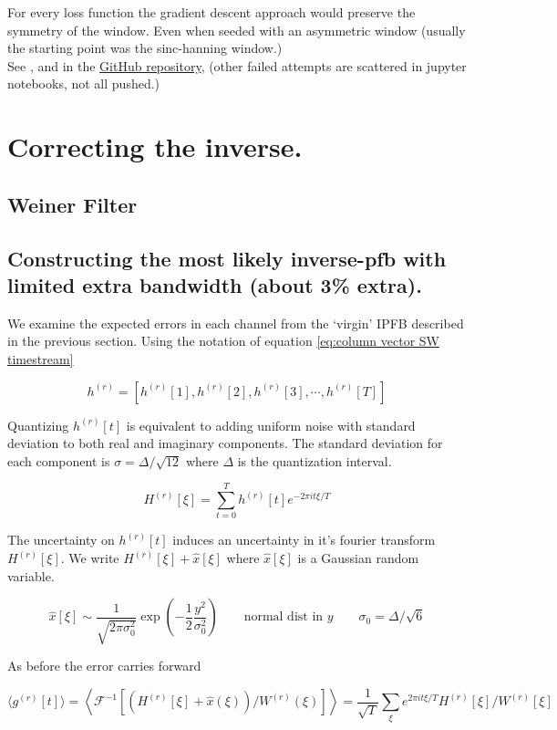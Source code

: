 \documentclass[12pt]{article}
\begin{document}
For every loss function the gradient descent approach would preserve the symmetry of the window. Even when seeded with an asymmetric window (usually the starting point was the sinc-hanning window.) \\

See ,  and  in the \href{https://github.com/dcxSt/pfb-mod}{GitHub repository}, (other failed attempts are scattered in jupyter notebooks, not all pushed.)

\section{Correcting the inverse.}
\subsection{Weiner Filter}


\subsection{Constructing the most likely inverse-pfb with limited extra bandwidth (about 3\% extra).}\label{sec:conjugate gradient ipfb}

We examine the expected errors in each channel from the `virgin' IPFB described in the previous section. Using the notation of equation \eqref{eq:column vector SW timestream} 

$$h^{(r)} = [h^{(r)}[1],h^{(r)}[2],h^{(r)}[3],\cdots ,h^{(r)}[T]]$$

Quantizing $h^{(r)}[t]$ is equivalent to adding uniform noise with standard deviation to both real and imaginary components. The standard deviation for each component is $\sigma = \Delta/\sqrt{12}$ where $\Delta$ is the quantization interval. 

$$H^{(r)}[\xi] = \sum_{t=0}^T h^{(r)}[t]e^{-2\pi i t\xi /T}$$

The uncertainty on $h^{(r)}[t]$ induces an uncertainty in it's fourier transform $H^{(r)}[\xi]$. We write $H^{(r)}[\xi] + \hat x[\xi]$ where $\hat x[\xi]$ is a Gaussian random variable. 

$$\hat x[\xi] \sim \frac{1}{\sqrt{2\pi \sigma_0^2}} \exp\left( -\frac{1}{2}\frac{y^2}{\sigma_0^2} \right) \qquad\text{normal dist in $y$}\qquad \sigma_0 = \Delta/\sqrt{6}$$

As before the error carries forward

$$\langle g^{(r)}[t]\rangle = \left\langle \mathcal F^{-1} [(H^{(r)}[\xi] + \hat x(\xi)) / W^{(r)}(\xi)]  \right\rangle = \frac{1}{\sqrt T}\sum_\xi e^{2\pi i t\xi /T} H^{(r)}[\xi] / W^{(r)}[\xi] $$
\end{document}

